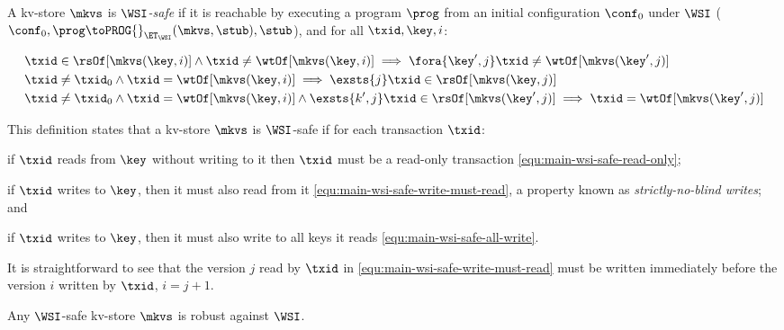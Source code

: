\spaceshrink{-3pt}
\begin{definition}
\label{def:main-body-wsi-safe}
    A kv-store \( \mkvs \) is \emph{\(\WSI\)-safe} if it is 
    reachable by executing a program \( \prog \) from an initial configuration \( \conf_0 \) under $\WSI$
   (\ie \( \conf_0, \prog \toPROG{}_{\ET_\WSI} (\mkvs, \stub), \stub\)), and for all $\txid, \key, i$:

   \spaceshrink{-10pt}
   {\displaymathfont
    \begin{align}
         & \txid \in \rsOf[\mkvs(\key,i)] \land \txid \neq \wtOf[\mkvs(\key,i)]  \implies \fora{\key',j} \txid \neq \wtOf[\mkvs(\key',j)] \label{equ:main-wsi-safe-read-only} \\
         & \txid \neq \txid_0 \land \txid = \wtOf[\mkvs(\key,i)] \implies \exsts{j} \txid \in \rsOf[\mkvs(\key,j)] \label{equ:main-wsi-safe-write-must-read} \\
         & \txid \neq \txid_0 \land \txid = \wtOf[\mkvs(\key,i)] \land \exsts{k', j} \txid \in \rsOf[\mkvs(\key',j)] \implies \txid = \wtOf[\mkvs(\key',j)] \label{equ:main-wsi-safe-all-write}
    \end{align}
    \normalsize
    }
   \spaceshrink{-15pt}

\end{definition}
\spaceshrink{-3pt}

This definition states that a kv-store $\mkvs$ is \(\WSI\)-safe if for each transaction $\txid$: 
\begin{enumerate*} 
    \item if $\txid$ reads from $\key$ without writing to it then $\txid$ must be a read-only transaction \eqref{equ:main-wsi-safe-read-only}; 
    \item if \( \txid \) writes to $\key$, then it must also read from it \eqref{equ:main-wsi-safe-write-must-read}, a property known as \emph{strictly-no-blind writes}; and
	\item  if \( \txid \) writes to $\key$, then it must also write to all keys it reads \eqref{equ:main-wsi-safe-all-write}.
\end{enumerate*}
It is straightforward to see that the version $j$ read by \( \txid \) in \eqref{equ:main-wsi-safe-write-must-read} must be written immediately before the version $i$ written by \( \txid \), \ie \( i {=} j + 1 \).

\spaceshrink{-3pt}
\begin{theorem}
 \label{thm:main-wsi-robust}
    Any \(\WSI\)-safe kv-store \( \mkvs \) is robust against \(\WSI\).   
\end{theorem}
\spaceshrink{-3pt}

